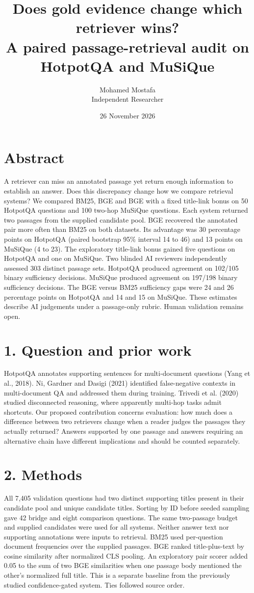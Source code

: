 \documentclass[11pt]{article}
\title{Does gold evidence change which retriever wins?\\ \large A paired passage-retrieval audit on HotpotQA and MuSiQue}
\author{Mohamed Mostafa \\ Independent Researcher}
\date{26 November 2026}
\begin{document}
\maketitle
\section*{Abstract}
A retriever can miss an annotated passage yet return enough information to establish an answer. Does this discrepancy change how we compare retrieval systems? We compared BM25, BGE and BGE with a fixed title-link bonus on 50 HotpotQA questions and 100 two-hop MuSiQue questions. Each system returned two passages from the supplied candidate pool. BGE recovered the annotated pair more often than BM25 on both datasets. Its advantage was 30 percentage points on HotpotQA (paired bootstrap 95\% interval 14 to 46) and 13 points on MuSiQue (4 to 23). The exploratory title-link bonus gained five questions on HotpotQA and one on MuSiQue. Two blinded AI reviewers independently assessed 303 distinct passage sets. HotpotQA produced agreement on 102/105 binary sufficiency decisions. MuSiQue produced agreement on 197/198 binary sufficiency decisions. The BGE versus BM25 sufficiency gaps were 24 and 26 percentage points on HotpotQA and 14 and 15 on MuSiQue. These estimates describe AI judgements under a passage-only rubric. Human validation remains open.

\section*{1. Question and prior work}
HotpotQA annotates supporting sentences for multi-document questions (Yang et al., 2018). Ni, Gardner and Dasigi (2021) identified false-negative contexts in multi-document QA and addressed them during training. Trivedi et al. (2020) studied disconnected reasoning, where apparently multi-hop tasks admit shortcuts. Our proposed contribution concerns evaluation: how much does a difference between two retrievers change when a reader judges the passages they actually returned? Answers supported by one passage and answers requiring an alternative chain have different implications and should be counted separately.

\section*{2. Methods}
All 7,405 validation questions had two distinct supporting titles present in their candidate pool and unique candidate titles. Sorting by ID before seeded sampling gave 42 bridge and eight comparison questions. The same two-passage budget and supplied candidates were used for all systems. Neither answer text nor supporting annotations were inputs to retrieval. BM25 used per-question document frequencies over the supplied passages. BGE ranked title-plus-text by cosine similarity after normalized CLS pooling. An exploratory pair scorer added 0.05 to the sum of two BGE similarities when one passage body mentioned the other's normalized full title. This is a separate baseline from the previously studied confidence-gated system. Ties followed source order.
\end{document}
